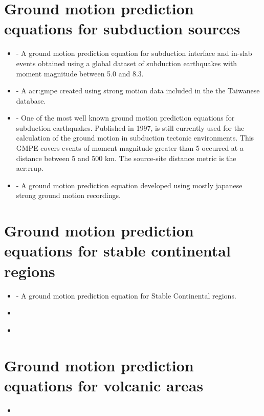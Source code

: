 \section{Ground motion prediction equations for subduction sources}
\begin{itemize}
    \item \cite{atkinson2003} - A ground motion prediction equation for 
        subduction interface and in-slab events obtained using a global 
        dataset of subduction earthquakes with moment magnitude between 
        5.0 and 8.3.
    \item \cite{lin2008} - A \gls{acr:gmpe} created using strong motion
        data included in the the Taiwanese database.
    \item \cite{youngs1997} - One of the most well known ground motion 
        prediction equations for subduction earthquakes. Published in 1997,
        is still currently used for the calculation of the ground motion 
        in subduction tectonic environments. This GMPE covers events of 
        moment magnitude greater than 5 occurred at a distance between 5
        and 500 km. The source-site distance metric is the \gls{acr:rrup}.
    \item \cite{zhao2006} - A ground motion prediction equation 
        developed using mostly japanese strong ground motion 
        recordings.
\end{itemize}
%
\section{Ground motion prediction equations for stable continental regions}
\begin{itemize}
    \item \cite{atkinson2006} - A ground motion prediction equation for 
    Stable Continental regions.
    \item \cite{campbell2003}
    \item \cite{toro2002}
\end{itemize}
%
\section{Ground motion prediction equations for volcanic areas}
\begin{itemize}
    \item \cite{faccioli2010}
\end{itemize}
